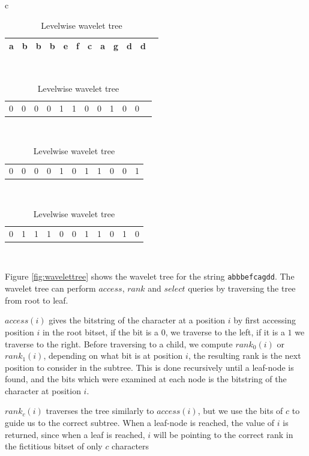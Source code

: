 \begin{table}[t!]
	\begin{center}
		\begin{tabular}{c}
            \begin{tabular}{c c c c c c c c c c c c}
                a & b & b & b & e & f & c & a & g & d & d \\
                \hline
            \end{tabular} \\
            \begin{tabular}{c c c c c c c c c c c c}
                0 & 0 & 0 & 0 & 1 & 1 & 0 & 0 & 1 & 0 & 0
            \end{tabular} \\
            \begin{tabular}{c c c c c c c c|c c c}
                0 & 0 & 0 & 0 & 1 & 0 & 1 & 1 & 0 & 0 & 1
            \end{tabular} \\
            \begin{tabular}{c c c c c|c c c|c c|c}
                0 & 1 & 1 & 1 & 0 & 0 & 1 & 1 & 0 & 1 & 0
            \end{tabular} \\
		\end{tabular}
		\caption{Levelwise wavelet tree}
		\label{table:levelwisewavelettree}
	\end{center}
\end{table}




Figure \ref{fig:wavelettree} shows the wavelet tree for the string \verb|abbbefcagdd|. The
wavelet tree can perform $access$, $rank$ and $select$ queries by traversing the tree from
root to leaf. 

$access(i)$ gives the bitstring of the character at a position $i$ by first accessing
position $i$ in the root bitset, if the bit is a $0$, we traverse to the left, if it is a
$1$ we traverse to the right. Before traversing to a child, we compute $rank_0(i)$ or
$rank_1(i)$, depending on what bit is at position $i$, the resulting rank is the next
position to consider in the subtree. This is done recursively until a leaf-node is found,
and the bits which were examined at each node is the bitstring of the character at
position $i$.

$rank_c(i)$ traverses the tree similarly to $access(i)$, but we use the bits of $c$ to
guide us to the correct subtree. When a leaf-node is reached, the value of $i$ is
returned, since when a leaf is reached, $i$ will be pointing to the correct rank in the
fictitious bitset of only $c$ characters

